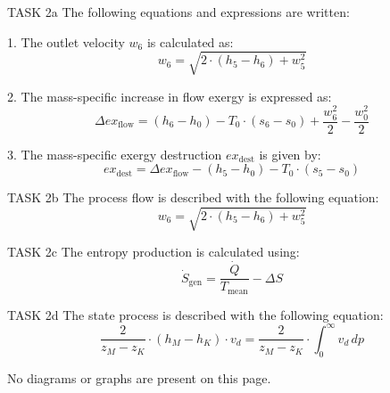 TASK 2a  
The following equations and expressions are written:  

1. The outlet velocity \( w_6 \) is calculated as:  
\[
w_6 = \sqrt{2 \cdot \left( h_5 - h_6 \right) + w_5^2}
\]  

2. The mass-specific increase in flow exergy is expressed as:  
\[
\Delta ex_{\text{flow}} = \left( h_6 - h_0 \right) - T_0 \cdot \left( s_6 - s_0 \right) + \frac{w_6^2}{2} - \frac{w_0^2}{2}
\]  

3. The mass-specific exergy destruction \( ex_{\text{dest}} \) is given by:  
\[
ex_{\text{dest}} = \Delta ex_{\text{flow}} - \left( h_5 - h_0 \right) - T_0 \cdot \left( s_5 - s_0 \right)
\]  

TASK 2b  
The process flow is described with the following equation:  
\[
w_6 = \sqrt{2 \cdot \left( h_5 - h_6 \right) + w_5^2}
\]  

TASK 2c  
The entropy production is calculated using:  
\[
\dot{S}_{\text{gen}} = \frac{\dot{Q}}{T_{\text{mean}}} - \Delta S
\]  

TASK 2d  
The state process is described with the following equation:  
\[
\frac{2}{z_M - z_K} \cdot \left( h_M - h_K \right) \cdot v_d = \frac{2}{z_M - z_K} \cdot \int_{0}^{\infty} v_d \, dp
\]  

No diagrams or graphs are present on this page.
